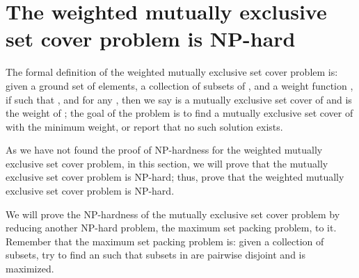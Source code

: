 \documentclass[11pt]{article}
\begin{document}
\section{The {\sc weighted mutually exclusive set cover} problem is NP-hard}
The formal definition of the {\sc weighted mutually exclusive set
cover} problem is: given a ground set  of  elements, a
collection  of  subsets of , and a weight function
, if  such that
, and  for any , then we say  is a mutually exclusive set cover of
 and  is the weight of ; the
goal of the problem is to find a mutually exclusive set cover of
 with the minimum weight, or report that no such solution
exists.

As we have not found the proof of NP-hardness for the {\sc
weighted mutually exclusive set cover} problem, in this section,
we will prove that the {\sc mutually exclusive set cover} problem
is NP-hard; thus, prove that the {\sc weighted mutually exclusive
set cover} problem is NP-hard.

We will prove the NP-hardness of the {\sc mutually exclusive set
cover} problem by reducing another NP-hard problem, the {\sc
maximum set packing} problem, to it. Remember that the {\sc
maximum set packing} problem is: given a collection  of
subsets, try to find an  such that
subsets in  are pairwise disjoint and  is
maximized.
\end{document}
